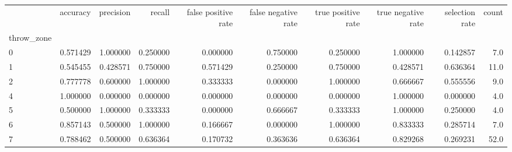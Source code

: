 \begin{tabular}{lrrrrrrrrr}
\toprule
{} &  accuracy &  precision &    recall &  false positive rate &  false negative rate &  true positive rate &  true negative rate &  selection rate &  count \\
throw\_zone &           &            &           &                      &                      &                     &                     &                 &        \\
\midrule
0          &  0.571429 &   1.000000 &  0.250000 &             0.000000 &             0.750000 &            0.250000 &            1.000000 &        0.142857 &    7.0 \\
1          &  0.545455 &   0.428571 &  0.750000 &             0.571429 &             0.250000 &            0.750000 &            0.428571 &        0.636364 &   11.0 \\
2          &  0.777778 &   0.600000 &  1.000000 &             0.333333 &             0.000000 &            1.000000 &            0.666667 &        0.555556 &    9.0 \\
4          &  1.000000 &   0.000000 &  0.000000 &             0.000000 &             0.000000 &            0.000000 &            1.000000 &        0.000000 &    4.0 \\
5          &  0.500000 &   1.000000 &  0.333333 &             0.000000 &             0.666667 &            0.333333 &            1.000000 &        0.250000 &    4.0 \\
6          &  0.857143 &   0.500000 &  1.000000 &             0.166667 &             0.000000 &            1.000000 &            0.833333 &        0.285714 &    7.0 \\
7          &  0.788462 &   0.500000 &  0.636364 &             0.170732 &             0.363636 &            0.636364 &            0.829268 &        0.269231 &   52.0 \\
\bottomrule
\end{tabular}

